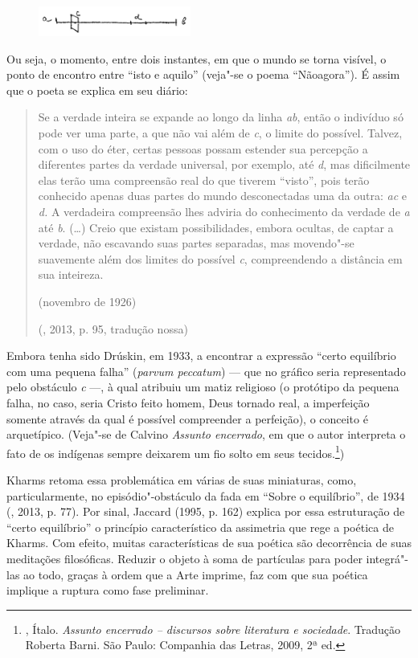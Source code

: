 \begin{figure}[!ht]
\centering
  \includegraphics[width=50mm]{./imgs/grafico4.jpg}
\end{figure}

Ou seja, o momento, entre dois instantes, em que o mundo se torna
visível, o ponto de encontro entre ``isto e aquilo'' (veja"-se o poema
``Nãoagora''). É assim que o poeta se explica em seu diário:

\begin{quotation}
Se a verdade inteira se expande ao longo da linha \emph{ab}, então o
indivíduo só pode ver uma parte, a que não vai além de \emph{c}, o
limite do possível. Talvez, com o uso do éter, certas pessoas possam estender sua percepção a
diferentes partes da verdade universal, por exemplo, até \emph{d}, mas
dificilmente elas terão uma compreensão real do que tiverem ``visto'',
pois terão conhecido apenas duas partes do mundo desconectadas uma da
outra: \emph{ac} e \emph{d.} A verdadeira compreensão lhes adviria do
conhecimento da verdade de \emph{a} até \emph{b}. (\ldots{}) Creio que
existam possibilidades, embora ocultas, de captar a verdade, não
escavando suas partes separadas, mas movendo"-se suavemente além dos
limites do possível \emph{c}, compreendendo a distância em sua
inteireza.

\noindent{}(novembro de 1926)

\noindent{}(, 2013, p. 95, tradução nossa)
\end{quotation}

Embora tenha sido Drúskin, em 1933, a encontrar a expressão ``certo
equilíbrio com uma pequena falha'' (\emph{parvum peccatum}) --- que no
gráfico seria representado pelo obstáculo \emph{c} ---, à qual
atribuiu um matiz religioso (o protótipo da pequena falha,
no caso, seria Cristo feito homem, Deus tornado real, a imperfeição
somente através da qual é possível compreender a perfeição), o conceito
é arquetípico. (Veja"-se de Calvino \emph{Assunto
encerrado}, em que o autor interpreta o fato de os indígenas sempre
deixarem um fio solto em seus tecidos.\footnote{, Ítalo. \emph{Assunto encerrado -- discursos sobre literatura e sociedade}. Tradução Roberta Barni. São Paulo: Companhia das Letras, 2009, 2ª ed.})

Kharms retoma essa problemática em várias de suas miniaturas, como, particularmente, no episódio"-obstáculo da fada em ``Sobre o equilíbrio'',
de 1934 (, 2013, p. 77). Por sinal, Jaccard (1995, p. 162)
explica por essa estruturação de ``certo equilíbrio'' o princípio característico da
assimetria que rege a poética de Kharms. Com efeito, muitas
características de sua poética são decorrência de suas meditações filosóficas. Reduzir o objeto à soma de
partículas para poder integrá"-las ao todo, graças à ordem que a Arte
imprime, faz com que sua poética implique a ruptura como fase
preliminar.

